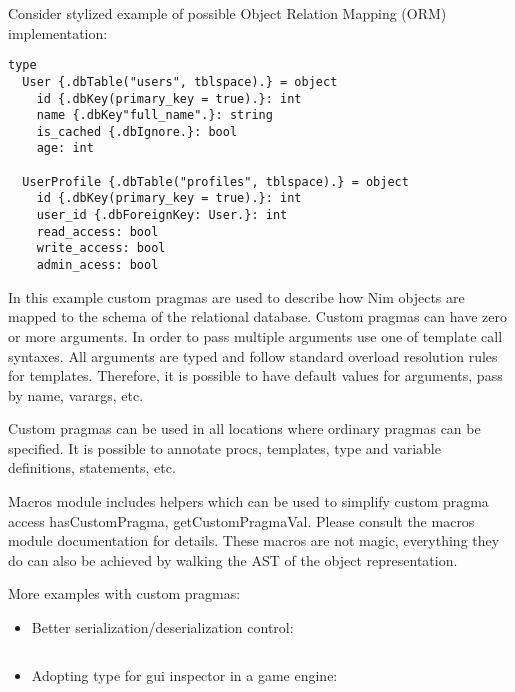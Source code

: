 \begin{verbatim}
\end{verbatim}

Consider stylized example of possible Object Relation Mapping (ORM)
implementation:

\begin{verbatim}
type
  User {.dbTable("users", tblspace).} = object
    id {.dbKey(primary_key = true).}: int
    name {.dbKey"full_name".}: string
    is_cached {.dbIgnore.}: bool
    age: int

  UserProfile {.dbTable("profiles", tblspace).} = object
    id {.dbKey(primary_key = true).}: int
    user_id {.dbForeignKey: User.}: int
    read_access: bool
    write_access: bool
    admin_acess: bool
\end{verbatim}

In this example custom pragmas are used to describe how Nim objects are
mapped to the schema of the relational database. Custom pragmas can have
zero or more arguments. In order to pass multiple arguments use one of
template call syntaxes. All arguments are typed and follow standard
overload resolution rules for templates. Therefore, it is possible to
have default values for arguments, pass by name, varargs, etc.

Custom pragmas can be used in all locations where ordinary pragmas can
be specified. It is possible to annotate procs, templates, type and
variable definitions, statements, etc.

Macros module includes helpers which can be used to simplify custom
pragma access {hasCustomPragma}, {getCustomPragmaVal}. Please consult
the macros module documentation for details. These macros are not magic,
everything they do can also be achieved by walking the AST of the object
representation.

More examples with custom pragmas:

\begin{itemize}
\tightlist
\item
  Better serialization/deserialization control:
\end{itemize}

\begin{verbatim}
\end{verbatim}

\begin{itemize}
\tightlist
\item
  Adopting type for gui inspector in a game engine:
\end{itemize}

